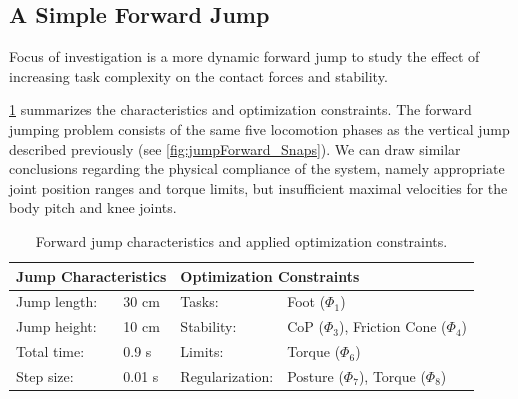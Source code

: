 \subsection{A Simple Forward Jump}
Focus of investigation is a more dynamic forward jump to study the effect of increasing task complexity on the contact forces and stability.

\cref{tab:jumpForward} summarizes the characteristics and optimization constraints. The forward jumping problem consists of the same five locomotion phases as the vertical jump described previously (see \cref{fig:jumpForward_Snaps}). 
We can draw similar conclusions regarding the physical compliance of the system, namely appropriate joint position ranges and torque limits, but insufficient maximal velocities for the body pitch and knee joints. 

\begin{table}[t]
\centering
\caption[Forward jump characteristics and optimization constraints]{Forward jump characteristics and applied optimization constraints.}
\begin{tabular}{|ll|ll|}
\hline
\multicolumn{2}{|l|}{\textbf{Jump Characteristics}} & \multicolumn{2}{l|}{\textbf{Optimization Constraints}} \\ \hline
Jump length:& 30 cm 	& Tasks: 			& Foot ($\Phi_1$) \\ \hline
Jump height:& 10 cm 	& Stability: 		& \gls{CoP} ($\Phi_3$), Friction Cone ($\Phi_4$)\\ \hline
Total time:& 0.9 s  	& Limits: 			& Torque ($\Phi_6$)\\ \hline
Step size:& 0.01 s   & Regularization: 	& Posture ($\Phi_7$), Torque ($\Phi_8$)\\ \hline
\end{tabular}
\label{tab:jumpForward}
\end{table}

